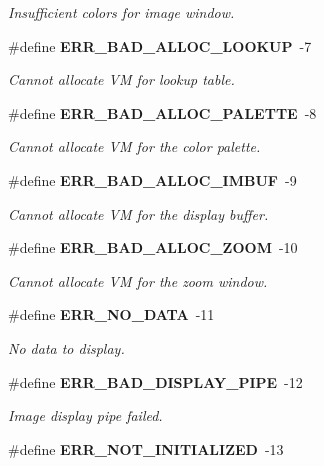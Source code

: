 \begin{CompactItemize}
\begin{CompactList}\small\item\em Insufficient colors for image window. \item\end{CompactList}\item 
\#define {\bf ERR\_\-BAD\_\-ALLOC\_\-LOOKUP}\ -7\label{xtv_8h_a43}

\begin{CompactList}\small\item\em Cannot allocate VM for lookup table. \item\end{CompactList}\item 
\#define {\bf ERR\_\-BAD\_\-ALLOC\_\-PALETTE}\ -8\label{xtv_8h_a44}

\begin{CompactList}\small\item\em Cannot allocate VM for the color palette. \item\end{CompactList}\item 
\#define {\bf ERR\_\-BAD\_\-ALLOC\_\-IMBUF}\ -9\label{xtv_8h_a45}

\begin{CompactList}\small\item\em Cannot allocate VM for the display buffer. \item\end{CompactList}\item 
\#define {\bf ERR\_\-BAD\_\-ALLOC\_\-ZOOM}\ -10\label{xtv_8h_a46}

\begin{CompactList}\small\item\em Cannot allocate VM for the zoom window. \item\end{CompactList}\item 
\#define {\bf ERR\_\-NO\_\-DATA}\ -11\label{xtv_8h_a47}

\begin{CompactList}\small\item\em No data to display. \item\end{CompactList}\item 
\#define {\bf ERR\_\-BAD\_\-DISPLAY\_\-PIPE}\ -12\label{xtv_8h_a48}

\begin{CompactList}\small\item\em Image display pipe failed. \item\end{CompactList}\item 
\#define {\bf ERR\_\-NOT\_\-INITIALIZED}\ -13\label{xtv_8h_a49}


\end{CompactItemize}
